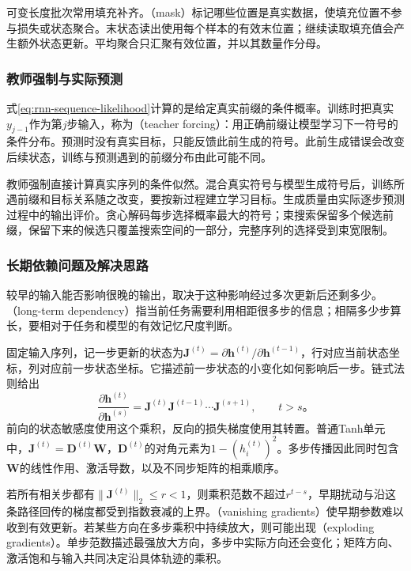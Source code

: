 可变长度批次常用填充补齐。（mask）标记哪些位置是真实数据，使填充位置不参与损失或状态聚合。末状态读出使用每个样本的有效末位置；继续读取填充值会产生额外状态更新。平均聚合只汇聚有效位置，并以其数量作分母。

\subsubsection{教师强制与实际预测}
\label{sec:rnn-teacher-forcing}

式\eqref{eq:rnn-sequence-likelihood}计算的是给定真实前缀的条件概率。训练时把真实$y_{j-1}$作为第$j$步输入，称为（teacher forcing）：用正确前缀让模型学习下一符号的条件分布。预测时没有真实目标，只能反馈此前生成的符号。此前生成错误会改变后续状态，训练与预测遇到的前缀分布由此可能不同。

教师强制直接计算真实序列的条件似然。混合真实符号与模型生成符号后，训练所遇前缀和目标关系随之改变，要按新过程建立学习目标。生成质量由实际逐步预测过程中的输出评价。贪心解码每步选择概率最大的符号；束搜索保留多个候选前缀，保留下来的候选只覆盖搜索空间的一部分，完整序列的选择受到束宽限制。

\subsubsection{长期依赖问题及解决思路}
\label{sec:rnn-long-dependencies}

较早的输入能否影响很晚的输出，取决于这种影响经过多次更新后还剩多少。（long-term dependency）指当前任务需要利用相距很多步的信息；相隔多少步算长，要相对于任务和模型的有效记忆尺度判断。

固定输入序列，记一步更新的状态为$\bm{J}^{(t)}=\partial\bm{h}^{(t)}/\partial\bm{h}^{(t-1)}$，行对应当前状态坐标，列对应前一步状态坐标。它描述前一步状态的小变化如何影响后一步。链式法则给出
\begin{equation}
  \frac{\partial\bm{h}^{(t)}}{\partial\bm{h}^{(s)}}
    =\bm{J}^{(t)}\bm{J}^{(t-1)}\cdots\bm{J}^{(s+1)},
    \qquad t>s\text{。}
  \label{eq:rnn-jacobian-product}
\end{equation}
前向的状态敏感度使用这个乘积，反向的损失梯度使用其转置。普通Tanh单元中，$\bm{J}^{(t)}=\bm{D}^{(t)}\bm{W}$，$\bm{D}^{(t)}$的对角元素为$1-(h_i^{(t)})^2$。多步传播因此同时包含$\bm{W}$的线性作用、激活导数，以及不同步矩阵的相乘顺序。

若所有相关步都有$\lVert\bm{J}^{(t)}\rVert_2\leq r<1$，则乘积范数不超过$r^{t-s}$，早期扰动与沿这条路径回传的梯度都受到指数衰减的上界。（vanishing gradients）使早期参数难以收到有效更新。若某些方向在多步乘积中持续放大，则可能出现（exploding gradients）。单步范数描述最强放大方向，多步中实际方向还会变化；矩阵方向、激活饱和与输入共同决定沿具体轨迹的乘积。

